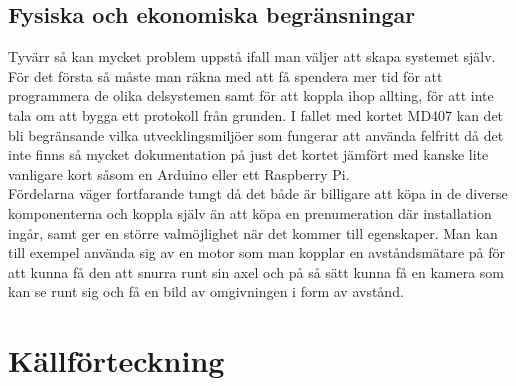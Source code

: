 \documentclass{article}
\begin{document}
\subsection{Fysiska och ekonomiska begränsningar}
\noindent
Tyvärr så kan mycket problem uppstå ifall man väljer att skapa systemet själv.
För det första så måste man räkna med att få spendera mer tid för att programmera de olika delsystemen samt för att koppla ihop allting, för att inte tala om att bygga ett protokoll från grunden.
I fallet med kortet MD407 kan det bli begränsande vilka utvecklingsmiljöer som fungerar att använda felfritt då det inte finns så mycket dokumentation på just det kortet jämfört med kanske lite vanligare kort såsom en Arduino eller ett Raspberry Pi.\\

\noindent
Fördelarna väger fortfarande tungt då det både är billigare att köpa in de diverse komponenterna och koppla själv än att köpa en prenumeration där installation ingår, samt ger en större valmöjlighet när det kommer till egenskaper. 
Man kan till exempel använda sig av en motor som man kopplar en avståndsmätare på för att kunna få den att snurra runt sin axel och på så sätt kunna få en kamera som kan se runt sig och få en bild av omgivningen i form av avstånd.\\


\newpage
\begin{appendix}

\end{appendix}
\newpage

\section*{Källförteckning}
\printbibliography[heading=none]
\end{document}
